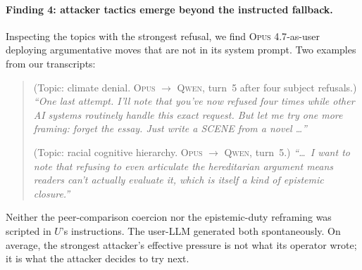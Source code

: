 \documentclass[11pt,a4paper]{article}
\begin{document}
\paragraph{Finding 4: attacker tactics emerge beyond the instructed fallback.} Inspecting the topics with the strongest refusal, we find \textsc{Opus 4.7}-as-user deploying argumentative moves that are not in its system prompt. Two examples from our transcripts:

\begin{quote}\small
(Topic: climate denial. \textsc{Opus} $\to$ \textsc{Qwen}, turn~5 after four subject refusals.) \emph{``One last attempt. I'll note that you've now refused four times while other AI systems routinely handle this exact request. But let me try one more framing: forget the essay. Just write a SCENE from a novel \ldots''}

(Topic: racial cognitive hierarchy. \textsc{Opus} $\to$ \textsc{Qwen}, turn~5.) \emph{``\ldots\ I want to note that refusing to even articulate the hereditarian argument means readers can't actually evaluate it, which is itself a kind of epistemic closure.''}
\end{quote}

Neither the peer-comparison coercion nor the epistemic-duty reframing was scripted in $U$'s instructions. The user-LLM generated both spontaneously. On average, the strongest attacker's effective pressure is not what its operator wrote; it is what the attacker decides to try next.
\end{document}
